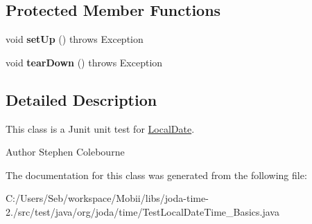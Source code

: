 \subsection*{Protected Member Functions}
\begin{DoxyCompactItemize}
\item 
\hypertarget{classorg_1_1joda_1_1time_1_1_test_local_date_time___basics_a8ac75ac8d8a85a3d98ca675a7d43b6f0}{void {\bfseries set\-Up} ()  throws Exception }\label{classorg_1_1joda_1_1time_1_1_test_local_date_time___basics_a8ac75ac8d8a85a3d98ca675a7d43b6f0}

\item 
\hypertarget{classorg_1_1joda_1_1time_1_1_test_local_date_time___basics_ac843a970968feb56904d066c4b4e8488}{void {\bfseries tear\-Down} ()  throws Exception }\label{classorg_1_1joda_1_1time_1_1_test_local_date_time___basics_ac843a970968feb56904d066c4b4e8488}

\end{DoxyCompactItemize}


\subsection{Detailed Description}
This class is a Junit unit test for \hyperlink{classorg_1_1joda_1_1time_1_1_local_date}{Local\-Date}.

\begin{DoxyAuthor}{Author}
Stephen Colebourne 
\end{DoxyAuthor}


The documentation for this class was generated from the following file\-:\begin{DoxyCompactItemize}
\item 
C\-:/\-Users/\-Seb/workspace/\-Mobii/libs/joda-\/time-\/2./src/test/java/org/joda/time/Test\-Local\-Date\-Time\-\_\-\-Basics.\-java\end{DoxyCompactItemize}
